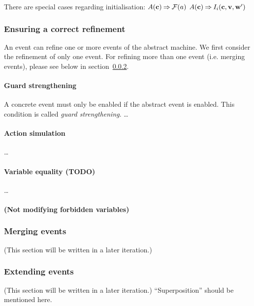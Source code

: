 There are special cases regarding initialisation:
  {$A(\mathbf{c}) \mathbin\Rightarrow  \mathcal{F}(a)$}
  {}%
  {$A(\mathbf{c}) \mathbin\Rightarrow I_i(\mathbf{c},{\mathbf{v},\mathbf{w}}')$}

\subsubsection{Ensuring a correct refinement}
\label{refinement_proof_obligations}
An event can refine one or more events of the abstract machine.
We first consider the refinement of only one event. 
For refining more than one event (i.e. merging events), please see below in section~\ref{merging_events}.

\paragraph{Guard strengthening}
A concrete event must only be enabled if the abstract event is enabled.
This condition is called \emph{guard strengthening}. \ldots

\paragraph{Action simulation} \ldots

\paragraph{Variable equality (TODO)} \ldots

\paragraph{(Not modifying forbidden variables)}


\subsubsection{Merging events}
\label{merging_events}
(This section will be written in a later iteration.)

\subsubsection{Extending events}
\label{extending_events}
(This section will be written in a later iteration.)
``Superposition'' should be mentioned here.


